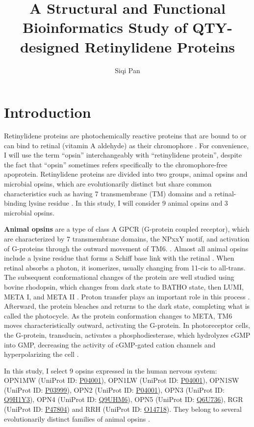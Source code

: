 \documentclass[fleqn, 10pt]{manuscript}
\title{A Structural and Functional Bioinformatics Study of QTY-designed Retinylidene Proteins}
\author[1]{Siqi Pan}
\affil[1]{Shanghai World Foreign Language Academy, 400 Baihua Street, Shanghai 200233, China}
\begin{document}
\flushbottom
\maketitle
\thispagestyle{empty}

\section*{Introduction}

Retinylidene proteins are photochemically reactive proteins that are bound to or can bind to retinal (vitamin A aldehyde) as their chromophore \citep{Spudich_2000}. For convenience, I will use the term ``opsin'' interchangeably with ``retinylidene protein'', despite the fact that ``opsin'' sometimes refers specifically to the chromophore-free apoprotein. Retinylidene proteins are divided into two groups, animal opsins and microbial opsins, which are evolutionarily distinct but share common characteristics such as having 7 transmembrane (TM) domains and a retinal-binding lysine residue \citep{Yee_2013, Spudich_2000}. In this study, I will consider 9 animal opsins and 3 microbial opsins. 

\textbf{Animal opsins} are a type of class A GPCR (G-protein coupled receptor), which are characterized by 7 transmembrane domains, the NPxxY motif, and activation of G-proteins through the outward movement of TM6. \citep{Zhou_2019}. Almost all animal opsins include a lysine residue that forms a Schiff base link with the retinal \citep{Guhmann_2022}. When retinal absorbs a photon, it isomerizes, usually changing from 11-cis to all-trans. The subsequent conformational changes of the protein are well studied using bovine rhodopsin, which changes from dark state to BATHO state, then LUMI, META I, and META II \citep{Okada_2001}. Proton transfer plays an important role in this process \citep{Mahalingam_2008}. Afterward, the protein bleaches and returns to the dark state, completing what is called the photocycle. As the protein conformation changes to META, TM6 moves characteristically outward, activating the G-protein. In photoreceptor cells, the G-protein, transducin, activates a phosphodiesterase, which hydrolyzes cGMP into GMP, decreasing the activity of cGMP-gated cation channels and hyperpolarizing the cell \citep{Chabre_1989}. 

In this study, I select 9 opsins expressed in the human nervous system: OPN1MW (UniProt ID: \href{https://www.uniprot.org/uniprotkb/P04001/entry}{P04001}), OPN1LW (UniProt ID: \href{https://www.uniprot.org/uniprotkb/P04000/entry}{P04001}), OPN1SW (UniProt ID: \href{https://www.uniprot.org/uniprotkb/P03999/entry}{P03999}), OPN2 (UniProt ID: \href{https://www.uniprot.org/uniprotkb/P08100/entry}{P04001}), OPN3 (UniProt ID: \href{https://www.uniprot.org/uniprotkb/Q9H1Y3/entry}{Q9H1Y3}), OPN4 (UniProt ID: \href{https://www.uniprot.org/uniprotkb/Q9UHM6/entry}{Q9UHM6}), OPN5 (UniProt ID: \href{https://www.uniprot.org/uniprotkb/Q6U736/entry}{Q6U736}), RGR (UniProt ID: \href{https://www.uniprot.org/uniprotkb/P47804/entry}{P47804}) and RRH (UniProt ID: \href{https://www.uniprot.org/uniprotkb/O14718/entry}{O14718}). They belong to several evolutionarily distinct families of animal opsins \citep{Terakita_2005}. 
\end{document}
